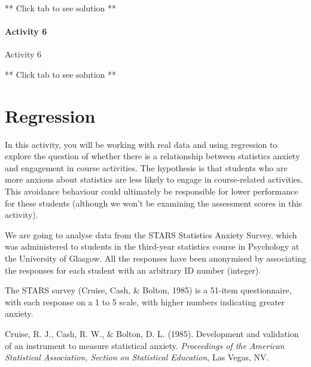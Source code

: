 \documentclass[]{book}
\newenvironment{Shaded}{\begin{snugshade}}{\end{snugshade}}
\newcommand{\CommentTok}[1]{\textcolor[rgb]{0.56,0.35,0.01}{\textit{#1}}}
\newcommand{\KeywordTok}[1]{\textcolor[rgb]{0.13,0.29,0.53}{\textbf{#1}}}
\newcommand{\NormalTok}[1]{#1}
\newcommand{\OperatorTok}[1]{\textcolor[rgb]{0.81,0.36,0.00}{\textbf{#1}}}
\begin{document}
** Click tab to see solution **

\hypertarget{activity-6-3}{%
\subsubsection{Activity 6}\label{activity-6-3}}

Activity 6

\begin{Shaded}
\end{Shaded}

** Click tab to see solution **

\hypertarget{regression}{%
\chapter{Regression}\label{regression}}

In this activity, you will be working with real data and using regression to explore the question of whether there is a relationship between statistics anxiety and engagement in course activities. The hypothesis is that students who are more anxious about statistics are less likely to engage in course-related activities. This avoidance behaviour could ultimately be responsible for lower performance for these students (although we won't be examining the assessment scores in this activity).

We are going to analyse data from the STARS Statistics Anxiety Survey, which was administered to students in the third-year statistics course in Psychology at the University of Glasgow. All the responses have been anonymised by associating the responses for each student with an arbitrary ID number (integer).

The STARS survey (Cruise, Cash, \& Bolton, 1985) is a 51-item questionnaire, with each response on a 1 to 5 scale, with higher numbers indicating greater anxiety.

Cruise, R. J., Cash, R. W., \& Bolton, D. L. (1985). Development and validation of an instrument to measure statistical anxiety. \emph{Proceedings of the American Statistical Association, Section on Statistical Education}, Las Vegas, NV.
\end{document}
